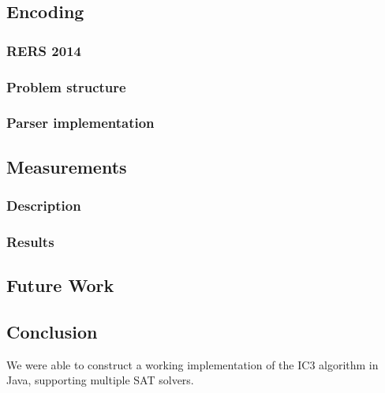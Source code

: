 \documentclass[a4paper]{article}
\begin{document}
\subsection{Encoding} %
\subsubsection{RERS 2014}
\subsubsection{Problem structure}
\subsubsection{Parser implementation}

\subsection{Measurements}
\subsubsection{Description}
\subsubsection{Results}

\subsection{Future Work}

\subsection{Conclusion}
We were able to construct a working implementation of the IC3 algorithm in Java, supporting multiple SAT solvers.
\end{document}
